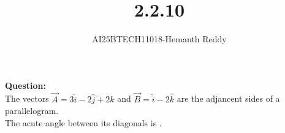\documentclass[journal]{IEEEtran}
\begin{document}

\vspace{3cm}

\title{2.2.10}
\author{AI25BTECH11018-Hemanth Reddy}
 \maketitle
{\let\newpage\relax\maketitle}

\renewcommand{\thefigure}{\theenumi}
\renewcommand{\thetable}{\theenumi}
\setlength{\intextsep}{10pt} %


\renewcommand{\thetable}{\theenumi}

\textbf{Question:}\\
The vectors $\vec{A} = 3\hat{i} - 2\hat{j} + 2\hat{k}$ and $\vec{B} = \hat{i} - 2\hat{k}$ are the adjancent sides of a parallelogram. \\
The acute angle between its diagonals is \underline{\hspace{2cm}}.\\
\end{document}
